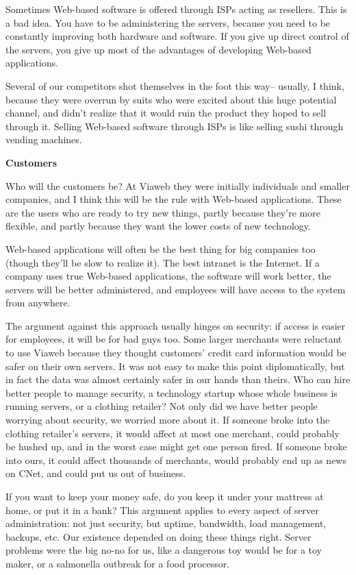 \documentclass[12pt]{book}
\begin{document}
Sometimes Web-based software is offered through ISPs acting as
resellers. This is a bad idea. You have to be administering the servers,
because you need to be constantly improving both hardware and software.
If you give up direct control of the servers, you give up most of the
advantages of developing Web-based applications.

Several of our competitors shot themselves in the foot this way--
usually, I think, because they were overrun by suits who were excited
about this huge potential channel, and didn't realize that it would ruin
the product they hoped to sell through it. Selling Web-based software
through ISPs is like selling sushi through vending machines.

\textbf{Customers}

Who will the customers be? At Viaweb they were initially individuals and
smaller companies, and I think this will be the rule with Web-based
applications. These are the users who are ready to try new things,
partly because they're more flexible, and partly because they want the
lower costs of new technology.

Web-based applications will often be the best thing for big companies
too (though they'll be slow to realize it). The best intranet is the
Internet. If a company uses true Web-based applications, the software
will work better, the servers will be better administered, and employees
will have access to the system from anywhere.

The argument against this approach usually hinges on security: if access
is easier for employees, it will be for bad guys too. Some larger
merchants were reluctant to use Viaweb because they thought customers'
credit card information would be safer on their own servers. It was not
easy to make this point diplomatically, but in fact the data was almost
certainly safer in our hands than theirs. Who can hire better people to
manage security, a technology startup whose whole business is running
servers, or a clothing retailer? Not only did we have better people
worrying about security, we worried more about it. If someone broke into
the clothing retailer's servers, it would affect at most one merchant,
could probably be hushed up, and in the worst case might get one person
fired. If someone broke into ours, it could affect thousands of
merchants, would probably end up as news on CNet, and could put us out
of business.

If you want to keep your money safe, do you keep it under your mattress
at home, or put it in a bank? This argument applies to every aspect of
server administration: not just security, but uptime, bandwidth, load
management, backups, etc. Our existence depended on doing these things
right. Server problems were the big no-no for us, like a dangerous toy
would be for a toy maker, or a salmonella outbreak for a food processor.
\end{document}
